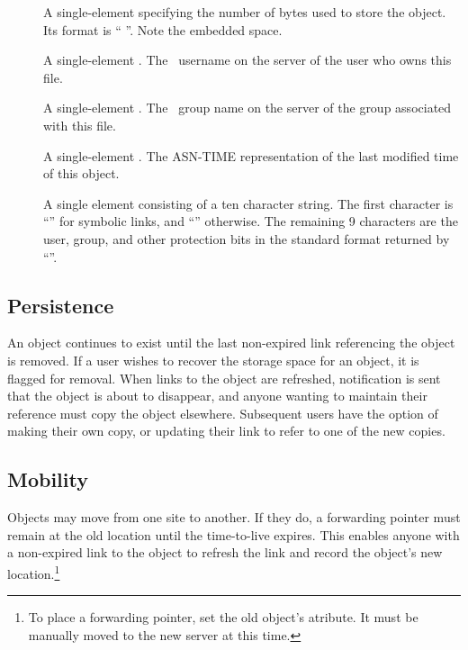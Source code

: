 \begin{description}

\item[] A single-element  specifying the
number of bytes used to store the object.  Its format is
`` ''.  Note the embedded space.

\item[]  A single-element .  The
\unix\ username on the server of the user who owns this file.

\item[]  A single-element .  The
\unix\ group name on the server of the group associated with this
file.

\item[] A single-element .  The
ASN-TIME representation of the last modified time of this object.

\item[] A single element  consisting of
a ten character string.  The first character is ``'' for
symbolic links, and ``\lit{-}'' otherwise.  The remaining 9 characters
are the user, group, and other protection bits in the standard format
returned by ``''.

\end{description}

\subsection{Persistence}

An object continues to exist until the last non-expired link
referencing the object is removed.  If a user wishes to recover the
storage space for an object, it is flagged for removal.  When links to
the object are refreshed, notification is sent that the object is
about to disappear, and anyone wanting to maintain their reference
must copy the object elsewhere.  Subsequent users have the option of
making their own copy, or updating their link to refer to one of the
new copies.

\subsection{Mobility}

Objects may move from one site to another.  If they do, a forwarding
pointer must remain at the old location until the time-to-live
expires.  This enables anyone with a non-expired link to the object to
refresh the link and record the object's new location.\footnote{To
place a forwarding pointer, set the old object's
 atribute.  It must be manually moved to the
new server at this time.}

